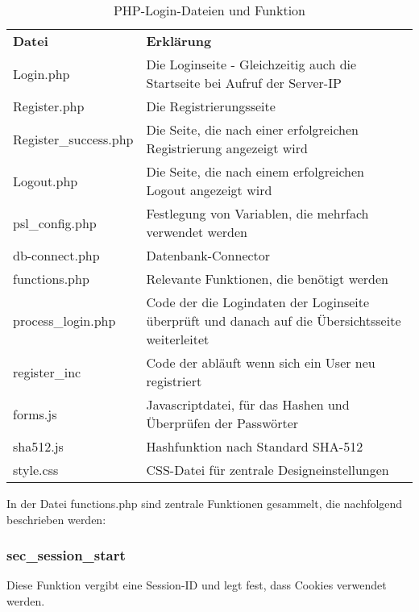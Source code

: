 \begin{table}
\caption{PHP-Login-Dateien und Funktion}
\label{tab:Login-Dateien}
\begin{tabular}{p{} p{}}
\textbf{Datei} 	& \textbf{Erklärung} \\
Login.php 		& Die Loginseite - Gleichzeitig auch die Startseite bei Aufruf der
Server-IP\\
Register.php 	& Die Registrierungsseite \\
Register\_success.php & Die Seite, die nach einer erfolgreichen Registrierung
angezeigt wird \\
Logout.php 		& Die Seite, die nach einem erfolgreichen Logout angezeigt wird \\
psl\_config.php & Festlegung von Variablen, die mehrfach verwendet werden \\
db-connect.php 	& Datenbank-Connector \\
functions.php 	& Relevante Funktionen, die benötigt werden \\
process\_login.php & Code der die Logindaten der Loginseite überprüft und danach auf die Übersichtsseite
weiterleitet \\
register\_inc 	& Code der abläuft wenn sich ein User neu registriert \\
forms.js 		& Javascriptdatei, für das Hashen und Überprüfen der Passwörter \\
sha512.js 		& Hashfunktion nach Standard SHA-512 \\
style.css 		& CSS-Datei für zentrale Designeinstellungen \\
 \end{tabular}
\end{table}

In der Datei functions.php sind zentrale Funktionen gesammelt, die nachfolgend
beschrieben werden:

\subsubsection{sec\_session\_start}
Diese Funktion vergibt eine Session-ID und legt fest, dass Cookies verwendet werden.

